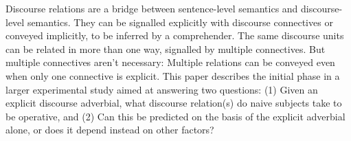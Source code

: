 Discourse relations are a bridge between sentence-level semantics and discourse-level semantics. They can be signalled explicitly with discourse connectives or conveyed implicitly, to be inferred by a comprehender. The same discourse units can be related in more than one way, signalled by multiple connectives. But multiple connectives aren't necessary: Multiple relations can be conveyed even when only one connective is explicit. This paper describes the initial phase in a larger experimental study aimed at answering two questions: (1) Given an explicit discourse adverbial, what discourse relation(s) do naive subjects take to be operative, and (2) Can this be predicted on the basis of the explicit adverbial alone, or does it depend instead on other factors?
